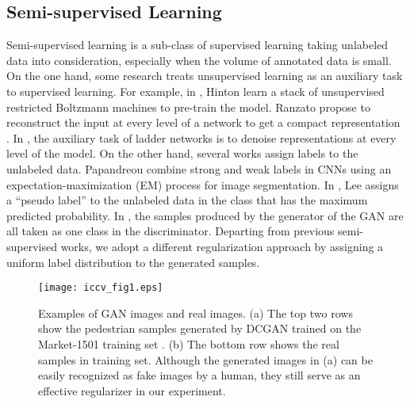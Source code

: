 \documentclass[10pt,twocolumn,letterpaper]{article}
\begin{document}
\subsection{Semi-supervised Learning}
Semi-supervised learning is a sub-class of supervised learning taking unlabeled data into consideration, especially when the volume of annotated data is small.  On the one hand, some research treats unsupervised learning as an auxiliary task to supervised learning. For example, in \cite{hinton2006reducing}, Hinton \etal learn a stack of unsupervised restricted Boltzmann machines to pre-train the model. Ranzato \etal propose to reconstruct the input at every level of a network to get a compact representation \cite{ranzato2008semi}. In \cite{rasmus2015semi}, the auxiliary task of ladder networks is to denoise representations at every level of the model. On the other hand, several works assign labels to the unlabeled data. Papandreou \etal \cite{papandreou2015weakly} combine strong and weak labels in CNNs using an expectation-maximization (EM) process for image segmentation. In \cite{lee2013pseudo}, Lee assigns a ``pseudo label'' to the unlabeled data in the class that has the maximum predicted probability. In \cite{odena2016semi,salimans2016improved}, the samples produced by the generator of the GAN are all taken as one class in the discriminator. Departing from previous semi-supervised works, we adopt a different regularization approach by assigning a uniform label distribution to the generated samples.

\begin{figure}[t]
\begin{center}
\texttt{[image: iccv\_fig1.eps]}
\end{center}
   \caption{Examples of GAN images and real images. (a) The top two rows show the pedestrian samples generated by DCGAN \cite{radford2015unsupervised} trained on the Market-1501 training set \cite{zheng2015scalable}. (b) The bottom row shows the real samples in training set. Although the generated images in (a) can be easily recognized as fake images by a human, they still serve as an effective regularizer in our experiment. }
\label{fig:imperfect}
\end{figure} 
\end{document}
